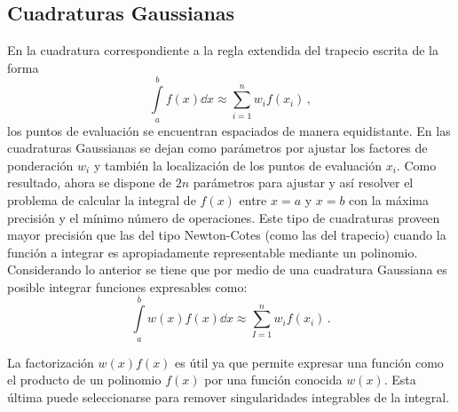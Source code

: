 \subsection{Cuadraturas Gaussianas}
En la cuadratura correspondiente a la regla extendida del trapecio escrita de la forma
\begin{equation}
\int\limits_a^b f(x) \dd{x} \approx \sum\limits_{i=1}^{n} w_i f(x_i)\, ,
\label{quadra2}
\end{equation}
los puntos de evaluación se encuentran espaciados de manera equidistante. En 
las cuadraturas Gaussianas se dejan como parámetros por ajustar los factores de 
ponderación $w_i$ y también la localización de los puntos de evaluación $x_i$. 
Como resultado, ahora se dispone de $2n$ parámetros para ajustar y
así resolver el problema de calcular la integral de $f(x)$ entre $x=a$ y $x=b$ 
con la máxima precisión y el mínimo número de operaciones. Este 
tipo de cuadraturas proveen mayor precisión que las del tipo Newton-Cotes (como 
las del trapecio) cuando la función a integrar es apropiadamente representable 
mediante un polinomio. Considerando lo anterior se tiene que por medio de una 
cuadratura Gaussiana es posible integrar funciones expresables como:
\[\int\limits_a^b w(x) f(x) \dd{x}  \approx \sum\limits_{I = 1}^{n} w_i 
f(x_i)\, . \]

La factorización \(w(x) f(x)\) es útil ya que permite expresar una función como 
el producto de un polinomio $f(x)$ por una función conocida $w(x)$. Esta última 
puede seleccionarse para remover singularidades integrables de la integral.

%

